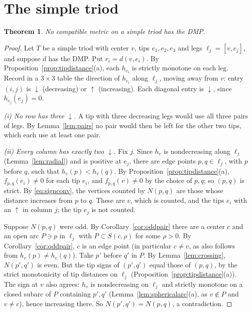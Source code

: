 \documentclass[11pt]{amsart}
\newtheorem{theorem}{Theorem}[section]
\theoremstyle{definition}
\theoremstyle{remark}
\newcommand{\N}{N}
\begin{document}
\section{The simple triod}\label{sec:triod}

\begin{theorem}\label{thm:triod}
No compatible metric on a simple triod has the DMP.
\end{theorem}

\begin{proof}
Let $T$ be a simple triod with center $v$, tips $e_1,e_2,e_3$ and legs $\ell_j=[v,e_j]$, and suppose $d$ has the DMP. Put $r_i=d(v,e_i)$. By Proposition~\ref{prop:tipdistance}(a), each $h_{e_i}$ is strictly monotone on each leg. Record in a $3\times3$ table the direction of $h_{e_i}$ along $\ell_j$, moving away from $v$: entry $(i,j)$ is $\downarrow$ (decreasing) or $\uparrow$ (increasing). Each diagonal entry is $\downarrow$, since $h_{e_j}(e_j)=0$.

\emph{(i) No row has three $\downarrow$.} A tip with three decreasing legs would use all three pairs of legs. By Lemma~\ref{lem:pairs} no pair would then be left for the other two tips, which each use at least one pair.

\emph{(ii) Every column has exactly two $\downarrow$.} Fix $j$. Since $h_v$ is nondecreasing along $\ell_j$ (Lemma~\ref{lem:radial}) and is positive at $e_j$, there are edge points $p,q\in\ell_j$, with $p$ before $q$, such that $h_v(p)<h_v(q)$. By Proposition~\ref{prop:tipdistance}(a), $f_{p,q}(e_i)\ne0$ for each tip $e_i$, and $f_{p,q}(v)\ne0$ by the choice of $p,q$; so $(p,q)$ is strict. By \eqref{eq:signconv}, the vertices counted by $\N(p,q)$ are those whose distance increases from $p$ to $q$. These are $v$, which is counted, and the tips $e_i$ with an $\uparrow$ in column $j$; the tip $e_j$ is not counted.

Suppose $\N(p,q)$ were odd. By Corollary~\ref{cor:oddpair} there are a center $c$ and an open arc $P\ni p$ in $\ell_j$ with $P\subset S(c,\rho)$ for some $\rho>0$. By Corollary~\ref{cor:oddpair}, $c$ is an edge point (in particular $c\ne v$, as also follows from $h_v(p)\ne h_v(q)$). Take $p'$ before $q'$ in $P$. By Lemma~\ref{lem:crossing}, $\N(p',q')$ is even. But the tip signs of $(p',q')$ equal those of $(p,q)$, by the strict monotonicity of tip distances on $\ell_j$ (Proposition~\ref{prop:tipdistance}(a)). The sign at $v$ also agrees: $h_v$ is nondecreasing on $\ell_j$ and strictly monotone on a closed subarc of $P$ containing $p',q'$ (Lemma~\ref{lem:sphericalarc}(a), as $v\notin P$ and $v\ne c$), hence increasing there. So $\N(p',q')=\N(p,q)$, a contradiction.


\end{proof}
\end{document}

